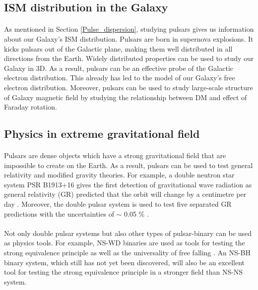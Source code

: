 \documentclass[thesis_msc.tex]{subfiles}
\begin{document}
    \subsection{ISM distribution in the Galaxy}
    \paragraph{} As mentioned in Section \ref{Pulse_dispersion}, studying pulsars gives us information about our Galaxy's ISM distribution. Pulsars are born in supernova explosions. It kicks pulsars out of the Galactic plane, making them well distributed in all directions from the Earth. Widely distributed properties can be used to study our Galaxy in 3D. As a result, pulsars can be an effective probe of the Galactic electron distribution. This already has led to the model of our Galaxy's free electron distribution. Moreover, pulsars can be used to study large-scale structure of Galaxy magnetic field by studying the relationship between DM and effect of Faraday rotation\citep{doi:10.1111/j.1365-2966.2008.13188.x}. 
    
    \subsection{Physics in extreme gravitational field}
    \paragraph{} Pulsars are dense objects which have a strong gravitational field that are impossible to create on the Earth. As a result, pulsars can be used to test general relativity and modified gravity theories. For example, a double neutron star system PSR B1913+16 gives the first detection of gravitational wave radiation as general relativity (GR) predicted that the orbit will change by a centimetre per day \citep{weisberg2004relativistic}. Moreover, the double pulsar system is used to test five separated GR predictions with the uncertainties of $\sim$ 0.05  \%  \citep{kramer2006tests}.  
    \paragraph{} Not only double pulsar systems but also other types of pulsar-binary can be used as physics tools. For example, NS-WD binaries are used as tools for testing the strong equivalence principle \citep{zhu2018tests} as well as the universality of free falling \citep{PhysRevLett.120.241104}. An NS-BH binary system, which still has  not yet been discovered, will also be an excellent tool for testing the strong equivalence principle in a stronger field than NS-NS system. 
        
\end{document}
